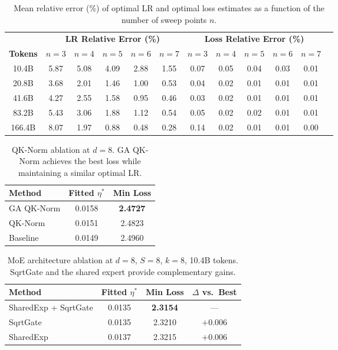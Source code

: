 \documentclass{article}
\begin{document}
\begin{table}[H]
\centering
\caption{Mean relative error (\%) of optimal LR and optimal loss estimates as a function of the number of sweep points $n$.}
\label{tab:sensitivity}
\vspace{0.1cm}
\begin{tabular}{cccccccccccc}
\toprule
 & \multicolumn{5}{c}{\textbf{LR Relative Error (\%)}} & \multicolumn{5}{c}{\textbf{Loss Relative Error (\%)}} \\
\cmidrule(lr){2-6} \cmidrule(lr){7-11}
\textbf{Tokens} & $n{=}3$ & $n{=}4$ & $n{=}5$ & $n{=}6$ & $n{=}7$ & $n{=}3$ & $n{=}4$ & $n{=}5$ & $n{=}6$ & $n{=}7$ \\
\midrule
10.4B  & 5.87 & 5.08 & 4.09 & 2.88 & 1.55 & 0.07 & 0.05 & 0.04 & 0.03 & 0.01 \\
20.8B  & 3.68 & 2.01 & 1.46 & 1.00 & 0.53 & 0.04 & 0.02 & 0.01 & 0.01 & 0.01 \\
41.6B  & 4.27 & 2.55 & 1.58 & 0.95 & 0.46 & 0.03 & 0.02 & 0.01 & 0.01 & 0.01 \\
83.2B  & 5.43 & 3.06 & 1.88 & 1.12 & 0.54 & 0.05 & 0.02 & 0.02 & 0.01 & 0.01 \\
166.4B & 8.07 & 1.97 & 0.88 & 0.48 & 0.28 & 0.14 & 0.02 & 0.01 & 0.01 & 0.00 \\
\bottomrule
\end{tabular}
\end{table}

\begin{table}[H]
\centering
\caption{QK-Norm ablation at $d{=}8$. GA QK-Norm achieves the best loss while maintaining a similar optimal LR.}
\label{tab:qknorm}
\vspace{0.1cm}
\begin{tabular}{lcc}
\toprule
\textbf{Method} & \textbf{Fitted $\eta^*$} & \textbf{Min Loss } \\
\midrule
GA QK-Norm & 0.0158 & \textbf{2.4727} \\
QK-Norm    & 0.0151 & 2.4823 \\
Baseline   & 0.0149 & 2.4960 \\
\bottomrule
\end{tabular}
\end{table}

\begin{table}[H]
\centering
\caption{MoE architecture ablation at $d{=}8$, $S{=}8$, $k{=}8$, 10.4B tokens. SqrtGate and the shared expert provide complementary gains.}
\label{tab:moe-ablation}
\vspace{0.1cm}
\begin{tabular}{lccc}
\toprule
\textbf{Method} & \textbf{Fitted $\eta^*$} & \textbf{Min Loss} & \textbf{$\Delta$ vs.\ Best} \\
\midrule
SharedExp + SqrtGate & 0.0135 & \textbf{2.3154} & --- \\
SqrtGate             & 0.0135 & 2.3210 & $+0.006$ \\
SharedExp            & 0.0137 & 2.3215 & $+0.006$ \\
\bottomrule
\end{tabular}
\end{table}
\end{document}

